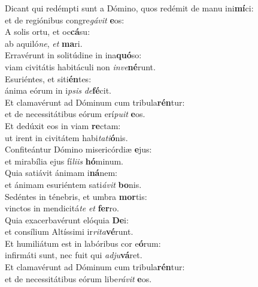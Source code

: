 \evenverse Dicant qui redémpti sunt a Dómino, quos redémit de manu ini\textbf{mí}ci:~\*\\
\evenverse et de regiónibus congre\textit{gá}\textit{vit} \textbf{e}os:\\
\oddverse A solis ortu, et oc\textbf{cá}su:~\*\\
\oddverse ab aquiló\textit{ne}, \textit{et} \textbf{ma}ri.\\
\evenverse Erravérunt in solitúdine in ina\textbf{quó}so:~\*\\
\evenverse viam civitátis habitáculi non \textit{in}\textit{ve}\textbf{né}runt.\\
\oddverse Esuriéntes, et siti\textbf{én}tes:~\*\\
\oddverse ánima eórum in i\textit{psis} \textit{de}\textbf{fé}cit.\\
\evenverse Et clamavérunt ad Dóminum cum tribula\textbf{rén}tur:~\*\\
\evenverse et de necessitátibus eórum erí\textit{pu}\textit{it} \textbf{e}os.\\
\oddverse Et dedúxit eos in viam \textbf{re}ctam:~\*\\
\oddverse ut irent in civitátem habi\textit{ta}\textit{ti}\textbf{ó}nis.\\
\evenverse Confiteántur Dómino misericórdiæ \textbf{e}jus:~\*\\
\evenverse et mirabília ejus fí\textit{li}\textit{is} \textbf{hó}minum.\\
\oddverse Quia satiávit ánimam i\textbf{ná}nem:~\*\\
\oddverse et ánimam esuriéntem sati\textit{á}\textit{vit} \textbf{bo}nis.\\
\evenverse Sedéntes in ténebris, et umbra \textbf{mor}tis:~\*\\
\evenverse vinctos in mendicitá\textit{te} \textit{et} \textbf{fer}ro.\\
\oddverse Quia exacerbavérunt elóquia \textbf{De}i:~\*\\
\oddverse et consílium Altíssimi ir\textit{ri}\textit{ta}\textbf{vé}runt.\\
\evenverse Et humiliátum est in labóribus cor e\textbf{ó}rum:~\*\\
\evenverse infirmáti sunt, nec fuit qui \textit{ad}\textit{ju}\textbf{vá}ret.\\
\oddverse Et clamavérunt ad Dóminum cum tribula\textbf{rén}tur:~\*\\
\oddverse et de necessitátibus eórum libe\textit{rá}\textit{vit} \textbf{e}os.\\
